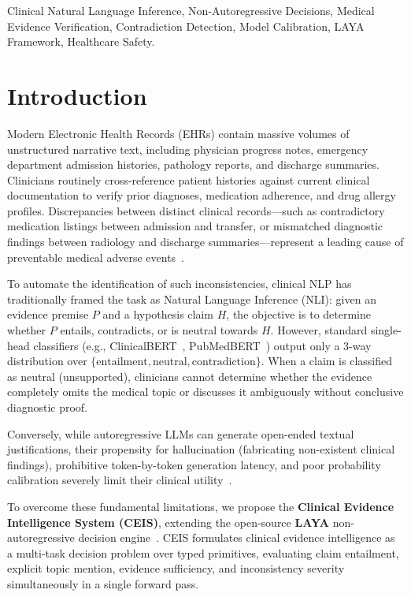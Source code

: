 \documentclass[10pt,conference]{IEEEtran}
\begin{document}
\begin{IEEEkeywords}
Clinical Natural Language Inference, Non-Autoregressive Decisions, Medical Evidence Verification, Contradiction Detection, Model Calibration, LAYA Framework, Healthcare Safety.
\end{IEEEkeywords}

\section{Introduction}
Modern Electronic Health Records (EHRs) contain massive volumes of unstructured narrative text, including physician progress notes, emergency department admission histories, pathology reports, and discharge summaries. Clinicians routinely cross-reference patient histories against current clinical documentation to verify prior diagnoses, medication adherence, and drug allergy profiles. Discrepancies between distinct clinical records---such as contradictory medication listings between admission and transfer, or mismatched diagnostic findings between radiology and discharge summaries---represent a leading cause of preventable medical adverse events~\cite{romanov2018lessons}.

To automate the identification of such inconsistencies, clinical NLP has traditionally framed the task as Natural Language Inference (NLI): given an evidence premise $P$ and a hypothesis claim $H$, the objective is to determine whether $P$ entails, contradicts, or is neutral towards $H$. However, standard single-head classifiers (e.g., ClinicalBERT~\cite{alsentzer2019publicly}, PubMedBERT~\cite{gu2021domain}) output only a 3-way distribution over $\{\text{entailment}, \text{neutral}, \text{contradiction}\}$. When a claim is classified as neutral (unsupported), clinicians cannot determine whether the evidence completely omits the medical topic or discusses it ambiguously without conclusive diagnostic proof. 

Conversely, while autoregressive LLMs can generate open-ended textual justifications, their propensity for hallucination (fabricating non-existent clinical findings), prohibitive token-by-token generation latency, and poor probability calibration severely limit their clinical utility~\cite{guo2017calibration}. 

To overcome these fundamental limitations, we propose the \textbf{Clinical Evidence Intelligence System (CEIS)}, extending the open-source \textbf{LAYA} non-autoregressive decision engine~\cite{laya2026}. CEIS formulates clinical evidence intelligence as a multi-task decision problem over typed primitives, evaluating claim entailment, explicit topic mention, evidence sufficiency, and inconsistency severity simultaneously in a single forward pass.
\end{document}
